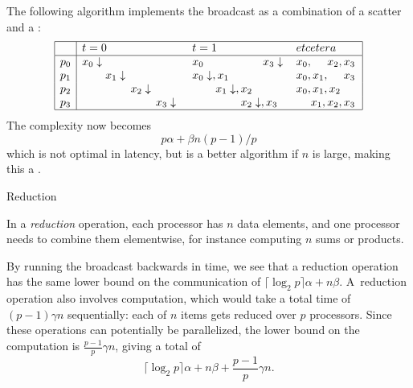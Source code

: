 The following algorithm implements the broadcast as a combination of a scatter
and a :
\[
\begin{array}{|c|lll|}
\hline
  &t=0&t=1&et cetera\\ \hline
p_0&x_0\downarrow\hphantom{,x_1\downarrow,x_2\downarrow,x_3\downarrow}
   &x_0\hphantom{\downarrow,x_1\downarrow,x_2\downarrow,}x_3\downarrow
   &x_0,\hphantom{x_1,}x_2,x_3\\
p_1&\hphantom{x_0\downarrow,}x_1\downarrow\hphantom{,x_2\downarrow,x_3\downarrow}
   &x_0\downarrow,x_1\hphantom{\downarrow,x_2\downarrow,x_3\downarrow}
   &x_0,x_1,\hphantom{x_2,}x_3\\
p_2&\hphantom{x_0\downarrow,x_1\downarrow,}x_2\downarrow\hphantom{,x_3\downarrow}
   &\hphantom{x_0\downarrow,}x_1\downarrow,x_2\hphantom{\downarrow,x_3\downarrow}
   &x_0,x_1,x_2\hphantom{,x_3}\\
p_3&\hphantom{x_0\downarrow,x_1\downarrow,x_2\downarrow,}x_3\downarrow
   &\hphantom{x_0\downarrow,x_1\downarrow,}x_2\downarrow,x_3\hphantom{\downarrow}
   &\hphantom{x_0,}x_1,x_2,x_3\\
\hline
\end{array}
\]
The complexity now becomes \[ p\alpha+\beta n(p-1)/p \]
which is not optimal in latency, but is a better algorithm if $n$ is large,
making this a .


 {Reduction}

In a \emph{reduction} operation, each processor has $n$ data elements, and
one processor needs to combine them elementwise, for instance
computing $n$ sums or products.

By running the broadcast backwards in time, we see that a reduction
operation has the same lower bound on the communication of
$\lceil\log_2 p\rceil \alpha+n\beta$.  A~reduction operation also
involves computation, which would take a total time of $(p-1)\gamma n$
sequentially: each of
$n$ items gets reduced over $p$ processors. Since these operations can
potentially be parallelized, the lower bound on the computation is
$\frac{p-1}p \gamma n$, giving a total of
    \[ \lceil\log_2 p\rceil \alpha+n\beta +\frac{p-1}p \gamma n. \]

